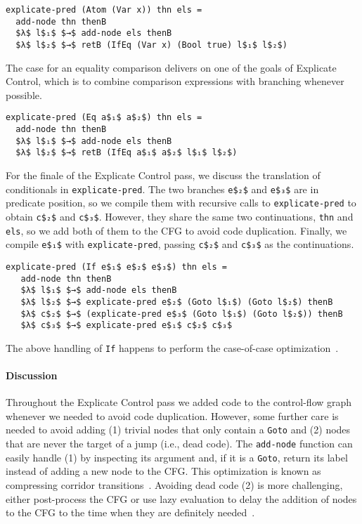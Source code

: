 \documentclass[sigplan,review,dvipsnames,screen,10pt]{acmart}
\begin{document}
\begin{lstlisting}
explicate-pred (Atom (Var x)) thn els =
  add-node thn thenB
  $λ$ l$₁$ $→$ add-node els thenB
  $λ$ l$₂$ $→$ retB (IfEq (Var x) (Bool true) l$₁$ l$₂$)
\end{lstlisting}

\noindent The case for an equality comparison delivers on one of the
goals of Explicate Control, which is to combine comparison expressions
with branching whenever possible.

\begin{lstlisting}
explicate-pred (Eq a$₁$ a$₂$) thn els =
  add-node thn thenB
  $λ$ l$₁$ $→$ add-node els thenB
  $λ$ l$₂$ $→$ retB (IfEq a$₁$ a$₂$ l$₁$ l$₂$)
\end{lstlisting}

For the finale of the Explicate Control pass, we discuss the
translation of conditionals in \lstinline{explicate-pred}.  The two
branches \lstinline{e$₂$} and \lstinline{e$₃$} are in predicate
position, so we compile them with recursive calls to
\lstinline{explicate-pred} to obtain \lstinline{c$₂$} and
\lstinline{c$₃$}. However, they share the same two continuations,
\lstinline{thn} and \lstinline{els}, so we add both of them to the CFG
to avoid code duplication. Finally, we compile \lstinline{e$₁$} with
\lstinline{explicate-pred}, passing \lstinline{c$₂$} and
\lstinline{c$₃$} as the continuations.

\begin{lstlisting}
explicate-pred (If e$₁$ e$₂$ e$₃$) thn els =
   add-node thn thenB
   $λ$ l$₁$ $→$ add-node els thenB
   $λ$ l$₂$ $→$ explicate-pred e$₂$ (Goto l$₁$) (Goto l$₂$) thenB
   $λ$ c$₂$ $→$ (explicate-pred e$₃$ (Goto l$₁$) (Goto l$₂$)) thenB
   $λ$ c$₃$ $→$ explicate-pred e$₁$ c$₂$ c$₃$
\end{lstlisting}

\noindent The above handling of \lstinline{If} happens to perform the
case-of-case optimization~\citep{PEYTONJONES19983}.

\paragraph{Discussion}

Throughout the Explicate Control pass we added code to the
control-flow graph whenever we needed to avoid code
duplication. However, some further care is needed to avoid adding (1)
trivial nodes that only contain a \lstinline{Goto} and (2) nodes that
are never the target of a jump (i.e., dead code). The
\lstinline{add-node} function can easily handle (1) by inspecting its
argument and, if it is a \lstinline{Goto}, return its label instead of
adding a new node to the CFG. This optimization is known as
compressing corridor transitions~\citep{Danvy:2009aa}.  Avoiding dead
code (2) is more challenging, either post-process the CFG or use lazy
evaluation to delay the addition of nodes to the CFG to the time when
they are definitely needed~\citep{Siek:2023tr}.
\end{document}
